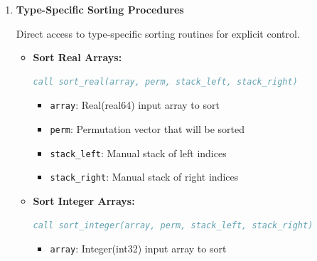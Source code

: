 \documentclass[11pt]{article}
\begin{document}
\begin{enumerate}
\begin{enumerate}
\begin{itemize}
	      	      	      \textbf{Supported Types:}
	      	      	      \begin{lstlisting}[language=Fortran]
! Real arrays
real(real64) :: data_real(:)
! Integer arrays  
integer(int32) :: data_int(:)
! Character arrays
character(len=*) :: data_char(:)
	      	      	      \end{lstlisting}
	      	      \end{itemize}
	      	      
	      	\item \textbf{Type-Specific Sorting Procedures}
	      	      
	      	      Direct access to type-specific sorting routines for explicit control.
	      	      
	      	      \begin{itemize}
	      	      	\item \textbf{Sort Real Arrays:}
	      	      	      \begin{lstlisting}[language=Fortran]
call sort_real(array, perm, stack_left, stack_right)
	      	      	      \end{lstlisting}
	      	      	      \begin{itemize}
	      	      	      	\item \texttt{array}: Real(real64) input array to sort
	      	      	      	      
	      	      	      	\item \texttt{perm}: Permutation vector that will be sorted
	      	      	      	      
	      	      	      	\item \texttt{stack\_left}: Manual stack of left indices
	      	      	      	      
	      	      	      	\item \texttt{stack\_right}: Manual stack of right indices
	      	      	      \end{itemize}
	      	      	      
	      	      	\item \textbf{Sort Integer Arrays:}
	      	      	      \begin{lstlisting}[language=Fortran]
call sort_integer(array, perm, stack_left, stack_right)
	      	      	      \end{lstlisting}
	      	      	      \begin{itemize}
	      	      	      	\item \texttt{array}: Integer(int32) input array to sort
	      	      	      	      

\end{itemize}
\end{itemize}
\end{enumerate}
\end{enumerate}
\end{document}
